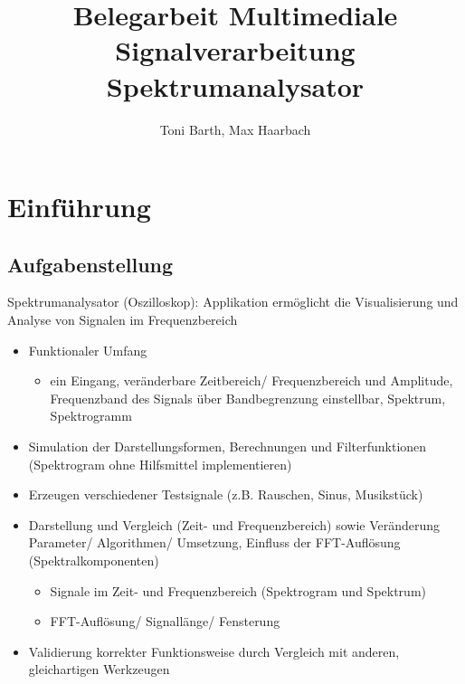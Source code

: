 \documentclass[a4paper]{article}
\title{Belegarbeit Multimediale Signalverarbeitung\\Spektrumanalysator}
\author{Toni Barth, Max Haarbach}
\begin{document}
\begin{titlepage}
\clearpage\maketitle
\thispagestyle{empty}
\end{titlepage}


\newpage
\tableofcontents
\newpage
\listoffigures
\newpage
\section{Einführung}\label{sec:einführung}

\subsection{Aufgabenstellung}\label{subsec:aufgabenstellung}

Spektrumanalysator (Oszilloskop): Applikation ermöglicht die Visualisierung und Analyse von Signalen im Frequenzbereich
\begin{itemize}
  \item Funktionaler Umfang
  \begin{itemize}
    \item ein Eingang, veränderbare Zeitbereich/ Frequenzbereich und Amplitude, Frequenzband des Signals über Bandbegrenzung einstellbar, Spektrum, Spektrogramm
  \end{itemize}
  \item Simulation der Darstellungsformen, Berechnungen und Filterfunktionen (Spektrogram ohne Hilfsmittel implementieren)
  \item Erzeugen verschiedener Testsignale (z.B. Rauschen, Sinus, Musikstück)
  \item Darstellung und Vergleich (Zeit- und Frequenzbereich) sowie Veränderung Parameter/ Algorithmen/ Umsetzung, Einfluss der FFT-Auflösung (Spektralkomponenten)
  \begin{itemize}
    \item Signale im Zeit- und Frequenzbereich (Spektrogram und Spektrum)
    \item FFT-Auflösung/ Signallänge/ Fensterung
  \end{itemize}
  \item Validierung korrekter Funktionsweise durch Vergleich mit anderen, gleichartigen Werkzeugen
\end{itemize}
\end{document}
